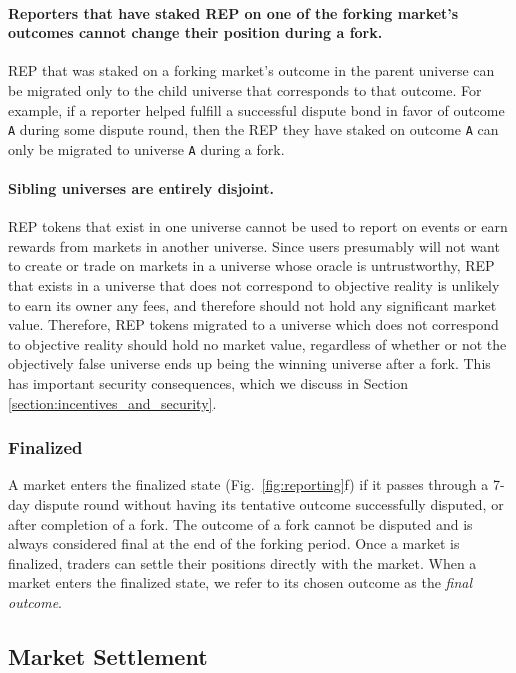 \documentclass[floatfix,reprint,nofootinbib,amsmath,amssymb,epsfig,pre,floats,letterpaper,groupedaffiliation]{revtex4-1}
\theoremstyle{definition}
\theoremstyle{definition}
\begin{document}
\paragraph*{Reporters that have staked REP on one of the forking market's outcomes cannot change their position during a fork.}  REP that was staked on a forking market's outcome in the parent universe can be migrated only to the child universe that corresponds to that outcome. For example, if a reporter helped fulfill a successful dispute bond in favor of outcome \texttt{A} during some dispute round, then the REP they have staked on outcome \texttt{A} can only be migrated to universe \texttt{A} during a fork.

\paragraph*{Sibling universes are entirely disjoint.}  REP tokens that exist in one universe cannot be used to report on events or earn rewards from markets in another universe.  Since users presumably will not want to create or trade on markets in a universe whose oracle is untrustworthy, REP that exists in a universe that does not correspond to objective reality is unlikely to earn its owner any fees, and therefore should not hold any significant market value.  Therefore, REP tokens migrated to a universe which does not correspond to objective reality should hold no market value, regardless of whether or not the objectively false universe ends up being the winning universe after a fork.  This has important security consequences, which we discuss in Section \ref{section:incentives_and_security}.

\subsubsection{Finalized}

A market enters the finalized state (Fig.~\ref{fig:reporting}f) if it passes through a 7-day dispute round without having its tentative outcome successfully disputed, or after completion of a fork.  The outcome of a fork cannot be disputed and is always considered final at the end of the forking period.  Once a market is finalized, traders can settle their positions directly with the market.  When a market enters the finalized state, we refer to its chosen outcome as the \textit{final outcome}.

\subsection{Market Settlement}\label{section:settlement}
\end{document}
